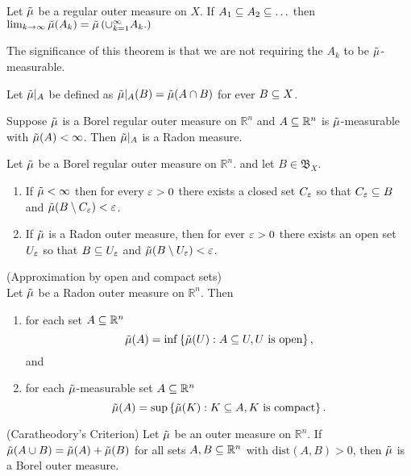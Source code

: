 \begin{thm}\cite[thm 2]{evans1991measure}
  Let $\tilde{\mu}$ be a regular outer measure on $X$. If $A_1\subseteq A_2 \subseteq \ldots$
  then $\lim_{k\to \infty}\tilde{\mu}(A_k) = \tilde{\mu}\left( \cup_{k=1}^\infty A_k.
  \right)$
\end{thm}

\begin{remark}
The significance of this theorem is that we are not requiring the $A_k$
to be $\tilde{\mu}$-measurable.
\end{remark}

\begin{defn}
  Let $\tilde{\mu}\rvert_A$ be defined as
  $\tilde{\mu}\rvert_A(B)= \tilde{\mu}(A\cap B)$ for ever $B\subseteq X$.
\end{defn}

\begin{thm}\cite[thm 3]{evans1991measure}
  Suppose $\tilde{\mu}$ is a Borel regular outer measure on $\mathbb{R}^n$ and $A\subseteq
  \mathbb{R}^n$ is $\tilde{\mu}$-measurable with $\tilde{\mu}(A)<\infty$. Then
  $\tilde{\mu}\rvert_A$ is a Radon measure. 
\end{thm}

\begin{lemma}\cite[lemma 1]{evans1991measure}
  Let $\tilde{\mu}$ be a Borel regular outer measure on $ \mathbb{R}^n$. and let
  $B\in \mathfrak{B}_X$.
  \begin{enumerate}
    \item If $\tilde{\mu} < \infty$ then for every $\varepsilon>0$ there exists a closed
      set $C_\varepsilon$ so that $C_\varepsilon \subseteq B$ and $\tilde{\mu}(B\setminus C_\varepsilon)<\varepsilon$.
    \item If $\tilde{\mu}$ is a Radon outer measure, then for ever $\varepsilon>0$ there
      exists an open set $U_\varepsilon$ so that $B\subseteq U_\varepsilon$ and
    $\tilde{\mu}(B\setminus U_\varepsilon)< \varepsilon$.
  \end{enumerate}
\end{lemma}

\begin{thm}\cite[thm 4]{evans1991measure}(Approximation by open and
  compact sets)\\
  Let $\tilde{\mu}$ be a Radon outer measure on $\mathbb{R}^n$. Then
  \begin{enumerate}
    \item for each set $A\subseteq \mathbb{R}^n$
      \begin{equation*}
        \tilde{\mu}(A) = \inf\left\{ \tilde{\mu}(U):A\subseteq U, U \text{ is open} \right\},
      \end{equation*}
      and
    \item for each $\tilde{\mu}$-measurable set $A\subseteq \mathbb{R}^n$
      \begin{equation*}
        \tilde{\mu}(A) = \sup\left\{ \tilde{\mu}(K):K\subseteq A, K \text{ is compact}
      \right\}.
      \end{equation*}
  \end{enumerate}
\end{thm}

\begin{thm}\cite[thm 5]{evans1991measure}(Caratheodory's Criterion)
  Let $\tilde{\mu}$ be an outer measure on $ \mathbb{R}^n$. If $\tilde{\mu}(A\cup B) =
  \tilde{\mu}(A)+\tilde{\mu}(B)$ for all sets $A,B\subseteq \mathbb{R}^n$ with
  $\text{dist}(A,B)>0$, then $\tilde{\mu}$ is a Borel outer measure.
\end{thm}
